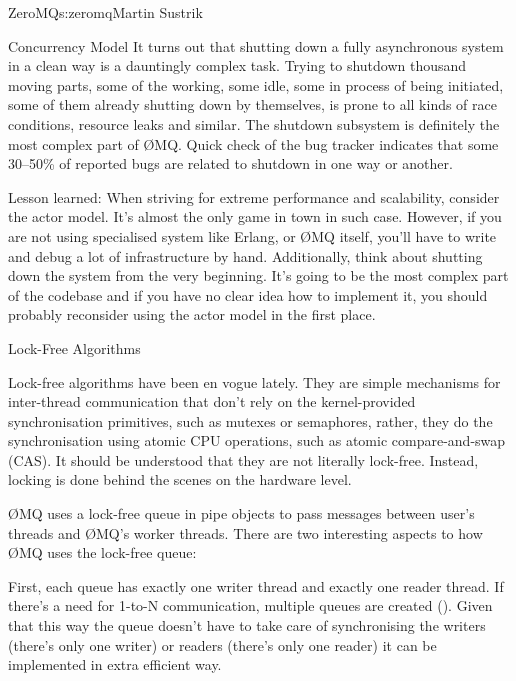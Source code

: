 \begin{aosachapter}{ZeroMQ}{s:zeromq}{Martin Sustrik}
\begin{aosasect1}{Concurrency Model}
It turns out that shutting down a fully asynchronous system in a clean
way is a dauntingly complex task. Trying to shutdown thousand moving
parts, some of the working, some idle, some in process of being
initiated, some of them already shutting down by themselves, is prone
to all kinds of race conditions, resource leaks and similar. The
shutdown subsystem is definitely the most complex part of ØMQ. Quick
check of the bug tracker indicates that some 30--50\% of reported bugs
are related to shutdown in one way or another.

Lesson learned: When striving for extreme performance and scalability,
consider the actor model. It's almost the only game in town in such
case. However, if you are not using specialised system like Erlang, or
ØMQ itself, you'll have to write and debug a lot of infrastructure by
hand. Additionally, think about shutting down the system from the very
beginning. It's going to be the most complex part of the codebase and
if you have no clear idea how to implement it, you should probably
reconsider using the actor model in the first place.

\end{aosasect1}

\begin{aosasect1}{Lock-Free Algorithms}

Lock-free algorithms have been en vogue lately. They are simple
mechanisms for inter-thread communication that don't rely on the
kernel-provided synchronisation primitives, such as mutexes or
semaphores, rather, they do the synchronisation using atomic CPU
operations, such as atomic compare-and-swap (CAS). It should be
understood that they are not literally lock-free. Instead, locking is
done behind the scenes on the hardware level.

ØMQ uses a lock-free queue in pipe objects to pass messages between
user's threads and ØMQ's worker threads. There are two interesting
aspects to how ØMQ uses the lock-free queue:

First, each queue has exactly one writer thread and exactly one reader
thread. If there's a need for 1-to-N communication, multiple queues
are created ().  Given that this way
the queue doesn't have to take care of synchronising the writers
(there's only one writer) or readers (there's only one reader) it can
be implemented in extra efficient way.



\end{aosasect1}
\end{aosachapter}
